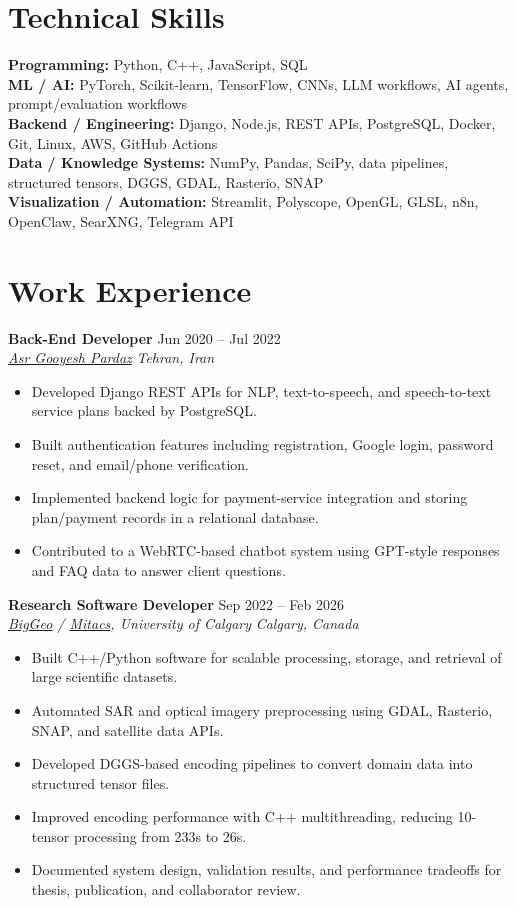 \documentclass[a4paper,10pt]{article}
\newcommand{\resumeSubheading}[4]{
    \textbf{#1} \hfill #2 \\
    \textit{#3} \hfill \textit{#4}
}
\begin{document}
\section*{Technical Skills}

\textbf{Programming:} Python, C++, JavaScript, SQL \\
\textbf{ML / AI:} PyTorch, Scikit-learn, TensorFlow, CNNs, LLM workflows, AI agents, prompt/evaluation workflows \\
\textbf{Backend / Engineering:} Django, Node.js, REST APIs, PostgreSQL, Docker, Git, Linux, AWS, GitHub Actions \\
\textbf{Data / Knowledge Systems:} NumPy, Pandas, SciPy, data pipelines, structured tensors, DGGS, GDAL, Rasterio, SNAP \\
\textbf{Visualization / Automation:} Streamlit, Polyscope, OpenGL, GLSL, n8n, OpenClaw, SearXNG, Telegram API


\section*{Work Experience}

\resumeSubheading
{Back-End Developer}
{Jun 2020 -- Jul 2022}
{\href{https://asr-gooyesh.com/en/}{Asr Gooyesh Pardaz}}
{Tehran, Iran}
\begin{itemize}[leftmargin=0.25in]
    \item Developed Django REST APIs for NLP, text-to-speech, and speech-to-text service plans backed by PostgreSQL.
    \item Built authentication features including registration, Google login, password reset, and email/phone verification.
    \item Implemented backend logic for payment-service integration and storing plan/payment records in a relational database.
    \item Contributed to a WebRTC-based chatbot system using GPT-style responses and FAQ data to answer client questions.
\end{itemize}

\resumeSubheading
{Research Software Developer}
{Sep 2022 -- Feb 2026}
{\href{https://biggeo.com}{BigGeo} / \href{https://www.mitacs.ca/}{Mitacs}, University of Calgary}
{Calgary, Canada}
\begin{itemize}[leftmargin=0.25in]
    \item Built C++/Python software for scalable processing, storage, and retrieval of large scientific datasets.
    \item Automated SAR and optical imagery preprocessing using GDAL, Rasterio, SNAP, and satellite data APIs.
    \item Developed DGGS-based encoding pipelines to convert domain data into structured tensor files.
    \item Improved encoding performance with C++ multithreading, reducing 10-tensor processing from 233s to 26s.
    \item Documented system design, validation results, and performance tradeoffs for thesis, publication, and collaborator review.
\end{itemize}
\end{document}
